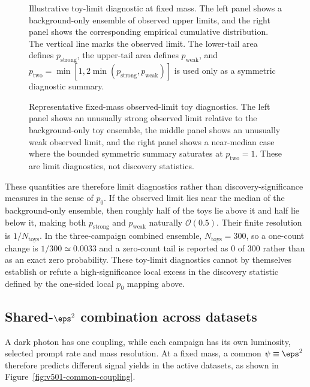 \begin{figure}[H]
\centering
{}
\caption{Illustrative toy-limit diagnostic at fixed mass. The left panel shows a
background-only ensemble of observed \CLs{} upper limits, and the right panel shows the
corresponding empirical cumulative distribution. The vertical line marks the observed
limit. The lower-tail area defines $p_{\mathrm{strong}}$, the upper-tail area defines
$p_{\mathrm{weak}}$, and
$p_{\mathrm{two}}=\min[1,2\min(p_{\mathrm{strong}},p_{\mathrm{weak}})]$ is used only
as a symmetric diagnostic summary.}
\label{fig:pvalue-tail-schematic}
\end{figure}

\begin{figure}[H]
\centering
{}
\caption{Representative fixed-mass observed-limit toy diagnostics. The left panel
shows an unusually strong observed limit relative to the background-only toy
ensemble, the middle panel shows an unusually weak observed limit, and the right
panel shows a near-median case where the bounded symmetric summary saturates at
$p_{\mathrm{two}}=1$. These are limit diagnostics, not discovery
statistics.}
\label{fig:pvalue-tail-examples}
\end{figure}

These quantities are therefore limit diagnostics rather than discovery-significance
measures in the sense of $p_0$. If the observed limit lies near the median of the
background-only ensemble, then roughly half of the toys lie above it and half lie
below it, making both $p_{\mathrm{strong}}$ and $p_{\mathrm{weak}}$ naturally
$\mathcal{O}(0.5)$. Their finite resolution is $1/N_{\mathrm{toys}}$. In the
three-campaign combined ensemble, $N_{\mathrm{toys}}=300$, so a one-count change is
$1/300\simeq0.0033$ and a zero-count tail is reported as 0 of 300 rather than as an
exact zero probability. These toy-limit diagnostics cannot by themselves establish
or refute a high-significance local excess in the discovery statistic defined by the
one-sided local $p_0$ mapping above.

\subsection{Shared-\texorpdfstring{$\eps^2$}{epsilon2} combination across datasets}
\label{sec:combination}

A dark photon has one coupling, while each campaign has its own luminosity,
selected prompt rate and mass resolution. At a fixed mass, a common
$\psi\equiv\eps^2$ therefore predicts different signal yields in the active
datasets, as shown in Figure~\ref{fig:v501-common-coupling}.

